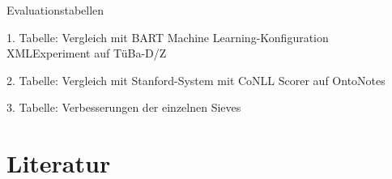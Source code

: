 \documentclass{scrartcl}
\begin{document}
Evaluationstabellen

1. Tabelle: Vergleich mit BART Machine Learning-Konfiguration XMLExperiment auf TüBa-D/Z

2. Tabelle: Vergleich mit Stanford-System mit CoNLL Scorer auf OntoNotes

3. Tabelle: Verbesserungen der einzelnen Sieves

\clearpage

\nocite{*}
\renewcommand*{\refname}{} %
\section{Literatur}  
{}

\end{document}
